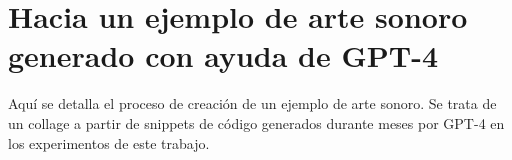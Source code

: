 \chapter{Hacia un ejemplo de arte sonoro generado con ayuda de GPT-4}

Aquí se detalla el proceso de creación de un ejemplo de arte sonoro. Se trata de un collage a partir de snippets de código generados durante meses por GPT-4 en los experimentos de este trabajo.